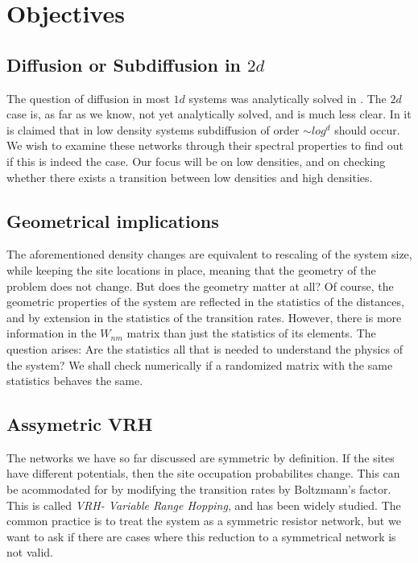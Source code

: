 \chapter{Objectives}

\section{Diffusion or Subdiffusion in $2d$}

The question of diffusion in most $1d$ systems was analytically solved in \cite{alexander_excitation_1981}. 
The $2d$ case is, as far as we know, not yet analytically solved, and is much less clear. 
In \cite{amir_localization_2010} it is claimed that in low density systems subdiffusion of
order $\sim log^d$ should occur. We wish to examine these networks through their spectral
properties to find out if this is indeed the case. Our focus will be on low densities,
and on checking whether there exists a transition between low densities and high densities.


\section{Geometrical implications}

The aforementioned density changes are equivalent to rescaling of the system size,
while keeping the site locations in place, meaning that the geometry of the problem 
does not change. But does the geometry matter at all? Of course, the geometric properties
of the system are reflected in the statistics of the distances,
and by extension in the statistics of the transition rates. 
However, there is more information in the $W_{nm}$ matrix than just the statistics of its elements.
The question arises: Are the statistics all that is needed to understand the physics of the system? 
We shall check numerically if a randomized matrix with the same statistics behaves the same.


\section{Assymetric VRH}

The networks we have so far discussed are symmetric by definition. 
If the sites have different potentials, then the site occupation probabilites change. This can be acommodated for by modifying the transition rates by Boltzmann's factor. This is called \emph{VRH- Variable Range Hopping}\cite{ambegaokar_hopping_1971}, and has been widely studied. The common practice is to treat the system as a symmetric resistor network, but we want to ask if there are cases where this reduction to a symmetrical network is not valid.


